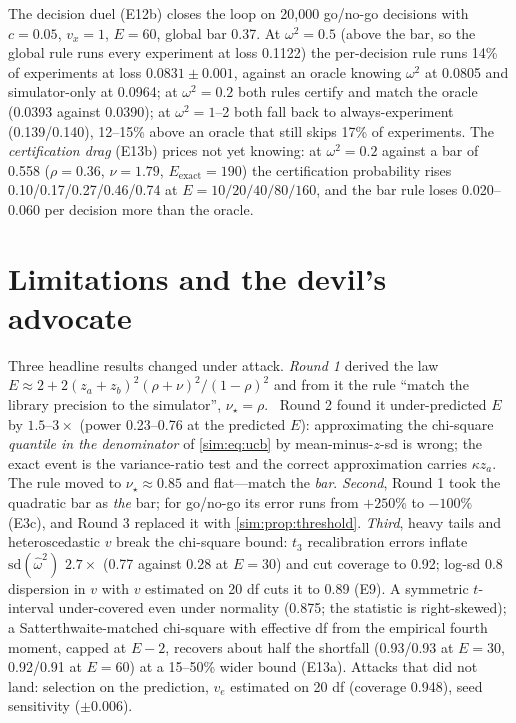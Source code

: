 The decision duel (E12b) closes the loop on 20,000 go/no-go decisions with $c = 0.05$, $v_x = 1$, $E = 60$, global bar 0.37. At $\omega^2 = 0.5$ (above the bar, so the global rule runs every experiment at loss 0.1122) the per-decision rule runs 14\% of experiments at loss $0.0831 \pm 0.001$, against an oracle knowing $\omega^2$ at 0.0805 and simulator-only at 0.0964; at $\omega^2 = 0.2$ both rules certify and match the oracle (0.0393 against 0.0390); at $\omega^2 = 1$--2 both fall back to always-experiment (0.139/0.140), 12--15\% above an oracle that still skips 17\% of experiments. The \emph{certification drag} (E13b) prices not yet knowing: at $\omega^2 = 0.2$ against a bar of 0.558 ($\rho = 0.36$, $\nu = 1.79$, $E_{\mathrm{exact}} = 190$) the certification probability rises 0.10/0.17/0.27/0.46/0.74 at $E = 10/20/40/80/160$, and the bar rule loses 0.020--0.060 per decision more than the oracle.

\section{Limitations and the devil's advocate}
\label{sim:sec:limits}

Three headline results changed under attack. \emph{Round 1} derived the law $E \approx 2 + 2(z_a + z_b)^2(\rho + \nu)^2/(1 - \rho)^2$ and from it the rule ``match the library precision to the simulator'', $\nu_\star = \rho$. \tagRefuted\ Round 2 found it under-predicted $E$ by $1.5$--$3\times$ (power 0.23--0.76 at the predicted $E$): approximating the chi-square \emph{quantile in the denominator} of \cref{sim:eq:ucb} by mean-minus-$z$-sd is wrong; the exact event is the variance-ratio test and the correct approximation carries $\kappa z_a$. The rule moved to $\nu_\star \approx 0.85$ and flat---match the \emph{bar}. \emph{Second}, Round 1 took the quadratic bar as \emph{the} bar; for go/no-go its error runs from $+250\%$ to $-100\%$ (E3c), and Round 3 replaced it with \cref{sim:prop:threshold}. \emph{Third}, heavy tails and heteroscedastic $v$ break the chi-square bound: $t_3$ recalibration errors inflate $\mathrm{sd}(\hat\omega^2)$ $2.7\times$ (0.77 against 0.28 at $E = 30$) and cut coverage to 0.92; log-sd 0.8 dispersion in $v$ with $v$ estimated on 20 df cuts it to 0.89 (E9). A symmetric $t$-interval under-covered even under normality (0.875; the statistic is right-skewed); a Satterthwaite-matched chi-square with effective df from the empirical fourth moment, capped at $E - 2$, recovers about half the shortfall (0.93/0.93 at $E = 30$, 0.92/0.91 at $E = 60$) at a 15--50\% wider bound (E13a). Attacks that did not land: selection on the prediction, $v_e$ estimated on 20 df (coverage 0.948), seed sensitivity ($\pm 0.006$).

